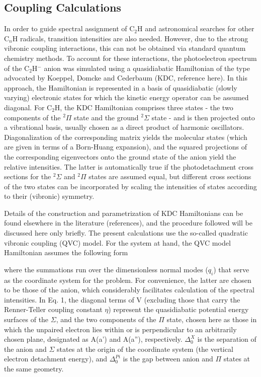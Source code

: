 \documentclass[journal=jpcafh,manuscript=article,layout=onecolumn, 12pt]{achemso}
\begin{document}
\subsection{Coupling Calculations}
In order to guide spectral assignment of C$_2$H and astronomical searches for other C$_n$H radicals, transition intensities are also needed. However, due to the strong vibronic coupling interactions, this can not be obtained via standard quantum chemistry methods. To account for these interactions, the photoelectron spectrum of the C$_2$H$^-$ anion was simulated using a quasidiabatic Hamiltonian of the type advocated by Koeppel, Domcke and Cederbaum (KDC, reference here).   In this approach, the Hamiltonian is represented in a basis of quasidiabatic (slowly varying) electronic  states for which the kinetic energy operator can be assumed diagonal.   For C$_2$H, the KDC Hamiltonian comprises three states - the two components of the $^2\Pi$ state and the ground $^2\Sigma$ state - and is then projected onto a vibrational basis, usually chosen as a direct product of harmonic oscillators.  Diagonalization of the corresponding matrix yields the molecular states (which are given in terms of a Born-Huang expansion), and the squared projections of the corresponding eigenvectors onto the ground state of the anion yield the relative intensities. The latter is automatically true if the photodetachment cross sections for the $^2\Sigma$ and $^2\Pi$ states are assumed equal, but different cross sections of the two states can be incorporated by scaling the intensities of states according to their (vibronic) symmetry. 

Details of the construction and parametrization of KDC Hamiltonians can be found elsewhere in the literature (references), and the procedure followed will be discussed here only briefly.   The present calculations use the so-called quadratic vibronic coupling (QVC) model.  For the system at hand, the QVC model Hamiltonian  assumes the following form

where the summations run over the dimensionless normal modes ($q_i$) that serve as the coordinate system for the problem.   For convenience, the latter are chosen to be those of the anion, which considerably facilitates calculation of the spectral intensities.  In Eq. 1, the diagonal terms of V (excluding those that carry the Renner-Teller coupling constant $\eta$) represent the quasidiabatic potential energy surfaces of the $\Sigma$, and the two components of the $\Pi$ state, chosen here as those in which the unpaired electron lies within or is perpendicular to an arbitrarily chosen plane, designated as A(a') and A(a''), respectively. $\Delta_0^X$ is the separation of the anion and $\Sigma$ states at the origin of the coordinate system (the vertical electron detachment energy), and $\Delta_0^{Pi}$ is the gap between anion and $\Pi$ states at the same geometry.   
\end{document}
